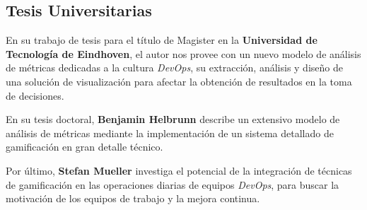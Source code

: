 \documentclass[journal]{IEEEtran}
\begin{document}
\subsection{\textbf{\large Tesis Universitarias}}

\cite{kruis2014designing} En su trabajo de tesis para el título de Magister en la \textbf{Universidad de Tecnología de Eindhoven}, el autor nos provee con un nuevo modelo de análisis de métricas dedicadas a la cultura \textit{DevOps}, su extracción, análisis y diseño de una solución de visualización para afectar la obtención de resultados en la toma de decisiones.

\cite{heilbrunn2014towards} En su tesis doctoral, \textbf{Benjamin Helbrunn} describe un extensivo modelo de análisis de métricas mediante la implementación de un sistema detallado de gamificación en gran detalle técnico.

\cite{mueller2024leveraging} Por último, \textbf{Stefan Mueller} investiga el potencial de la integración de técnicas de gamificación en las operaciones diarias de equipos \textit{DevOps}, para buscar la motivación de los equipos de trabajo y la mejora continua.



\end{document}
